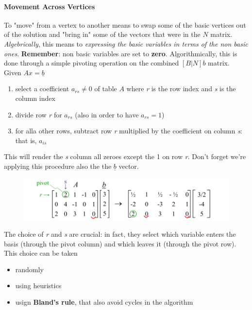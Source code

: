             \paragraph{Movement Across Vertices}
                To "move" from a vertex to another means to swap some of the basic vertices out of the solution and "bring in" some of the vectors that were in the $N$ matrix. \textit{Algebrically}, this means to \textit{expressing the basic variables in terms of the non basic ones}. \textbf{Remember}: non basic variables are set to \textbf{zero}. Algorithmically, this is done through a simple pivoting operation on the combined $[B\vert N]b$ matrix.\\
                Given $Ax = \underline{b}$
                \begin{enumerate}
                    \item select a coefficient $a_{rs} \neq 0$ of table $A$ where \emph{r} is the row index and \emph{s} is the column index
                    \item divide row \emph{r} for $a_{rs}$ (also in order to have $a_{rs} = 1$)
                    \item for alla other rows, subtract row \emph{r} multiplied by the coefficient on column \emph{s}: that is, $a_{is}$
                \end{enumerate}
                This will render the \emph{s} column all zeroes except the 1 on row \emph{r}. Don't forget we're applying this procedure also the the $\underline{b}$ vector.
                \begin{figure}[H]
                    \centering
                    \includegraphics[width = \textwidth]{./images/Simplex1.png}
                \end{figure}
                The choice of \emph{r} and \emph{s} are crucial: in fact, they select which variable enters the basis (through the pivot column) and which leaves it (through the pivot row). This choice can be taken
                \begin{itemize}
                    \item randomly
                    \item using heuristics
                    \item usign \textbf{Bland's rule}, that also avoid cycles in the algorithm
                \end{itemize}


